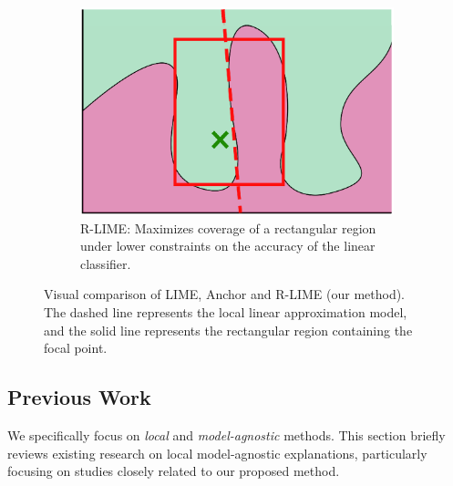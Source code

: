 \documentclass[runningheads]{llncs}
\begin{document}
{\begin{figure}[tbp]
\begin{subfigure}[t]{0.3\textwidth}
  \end{subfigure}
  \hspace{0.03\textwidth}
  \begin{subfigure}[t]{0.3\textwidth}
    \centering
    \includegraphics[width=\textwidth]{visual-rlime3}
    \caption{%
      R-LIME\@:
      Maximizes coverage of a rectangular region
      under lower constraints on the accuracy of the linear classifier.
    }\label{fig:rlime}
  \end{subfigure}
  \caption[Visual comparison of LIME, Anchor and R-LIME]{%
    Visual comparison of LIME, Anchor and R-LIME (our method).
    The dashed line represents the local linear approximation model,
    and the solid line represents the rectangular region containing the focal point.
  }
\end{figure}

\subsection{Previous Work}
We specifically focus on \emph{local} and \emph{model-agnostic} methods.
This section briefly reviews existing research on local model-agnostic explanations,
particularly focusing on studies closely related to our proposed method.

}
\end{document}
